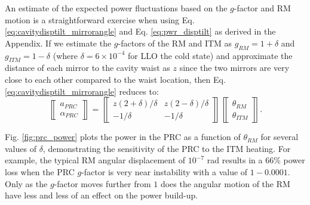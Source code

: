 An estimate of the expected power fluctuations based on the $g$-factor
and RM motion is a straightforward exercise when using
Eq. \ref{eq:cavitydisptilt_mirrorangle} and Eq. \ref{eq:pwr_disptilt}
as derived in the Appendix. If we estimate the $g$-factors of the RM
and ITM as $g_{RM} = 1+\delta$ and $g_{ITM} = 1 - \delta$ (where
$\delta =6 \times 10^{-4}$ for LLO the cold state) and approximate the
distance of each mirror to the cavity waist as $z$ since the two
mirrors are very close to each other compared to the waist location,
then Eq. \ref{eq:cavitydisptilt_mirrorangle} reduces to:
\begin{equation}
\left\llbracket \begin{array}{c}
a_{PRC} \\
\alpha_{PRC} \end{array} \right\rrbracket = 
\left\llbracket \begin{array}{cc}
z(2+\delta)/\delta & z(2-\delta)/\delta \\
-1/\delta & -1/\delta \end{array} \right\rrbracket
\left\llbracket \begin{array}{c}
\theta_{RM}\\
\theta_{ITM} \end{array} \right\rrbracket.
\end{equation}

Fig. \ref{fig:prc_power} plots the power in the PRC as a function of
$\theta_{RM}$ for several values of $\delta$, demonstrating
the sensitivity of the PRC to the ITM heating.  For example, the
typical RM angular displacement of $10^{-7}$ rad results in a 66\%
power loss when the PRC $g$-factor is very near instability with a
value of $1-0.0001$. Only as the $g$-factor moves further from $1$
does the angular motion of the RM have less and less of an effect on
the power build-up.

